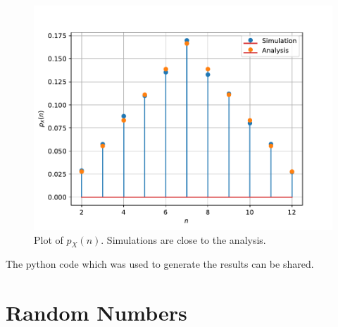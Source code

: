 \documentclass[12pt]{book}
\begin{document}
\begin{enumerate}
\begin{figure}[H]
\includegraphics[width=\columnwidth]{./figs/1/1.1.4.pdf}
\caption{Plot of $p_X(n)$.  Simulations are close to the analysis. }
\label{fig:dice}
\end{figure}
\begin{flushleft}
The python code which was used to generate the results can be shared.
\end{flushleft}
\begin{center}
\end{center}
\end{enumerate}

\chapter{Random Numbers}
\end{document}
